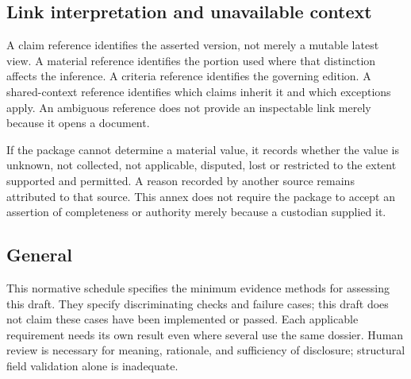 \documentclass[11pt,a4paper]{article}
\begin{document}
\subsection{Link interpretation and unavailable context}
A claim reference identifies the asserted version, not merely a mutable latest view. A material reference identifies the portion used where that distinction affects the inference. A criteria reference identifies the governing edition. A shared-context reference identifies which claims inherit it and which exceptions apply. An ambiguous reference does not provide an inspectable link merely because it opens a document.

If the package cannot determine a material value, it records whether the value is unknown, not collected, not applicable, disputed, lost or restricted to the extent supported and permitted. A reason recorded by another source remains attributed to that source. This annex does not require the package to accept an assertion of completeness or authority merely because a custodian supplied it.
\subsection{General}

This normative schedule specifies the minimum evidence methods for assessing this draft. They specify discriminating checks and failure cases; this draft does not claim these cases have been implemented or passed. Each applicable requirement needs its own result even where several use the same dossier. Human review is necessary for meaning, rationale, and sufficiency of disclosure; structural field validation alone is inadequate.
\end{document}
